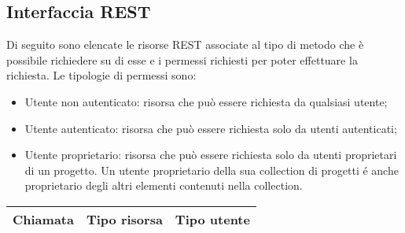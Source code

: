 \subsection{Interfaccia REST}
Di seguito sono elencate le risorse \gls{REST} associate al tipo di metodo che è possibile richiedere su di esse e i permessi richiesti per poter effettuare la richiesta.
Le tipologie di permessi sono:
\begin{itemize}
	\item Utente non autenticato: risorsa che può essere richiesta da qualsiasi utente;
	\item Utente autenticato: risorsa che può essere richiesta solo da utenti autenticati;
	\item Utente proprietario: risorsa che può essere richiesta solo da utenti proprietari di un progetto. Un utente proprietario della sua collection di progetti é anche proprietario degli altri elementi contenuti nella collection.
\end{itemize}

\begin{table}[h]
	\begin{tabular}{|p{}|p{}|p{}|}
		\toprule
		
		\textbf{Chiamata} & \textbf{Tipo risorsa}  & \textbf{Tipo utente} \\
		\bottomrule
	\end{tabular}\\	
\end{table}

